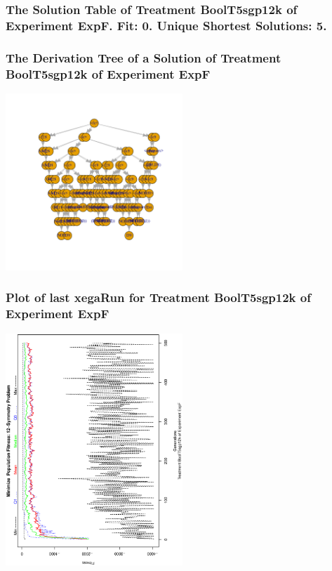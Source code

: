 \documentclass[18pt,c]{beamer}
\begin{document}
 \begin{frame}
 \fontsize{8pt}{9pt}\selectfont
 \frametitle{ The Solution Table of Treatment BoolT5sgp12k of Experiment ExpF. Fit: 0. Unique Shortest Solutions: 5. }

 \label{ExpFSolutionTable002.tex}  
 \end{frame}

 \begin{frame}
 \frametitle{ The Derivation Tree of a Solution of Treatment BoolT5sgp12k of Experiment ExpF }
 \begin{center}
\includegraphics[width=0.5\textwidth, angle=0]
{ExpFDerivationTreeFigure002.pdf}
 \end{center}
 \label{report/ExpFDerivationTreeFigure002.pdf}  
 \end{frame}

 \begin{frame}
 \frametitle{ Plot of last xegaRun for Treatment BoolT5sgp12k of Experiment ExpF }
 \begin{center}
\includegraphics[width=0.5\textwidth, angle=-90]
{ExpFPlotPopStatsFigure002.eps}
 \end{center}
 \label{report/ExpFPlotPopStatsFigure002.eps}  
 \end{frame}
\end{document}
